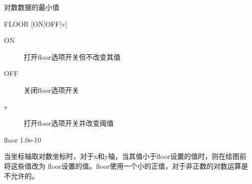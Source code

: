 \label{cmd:floor}

对数数据的最小值

\begin{SACSTX}
FLOOR [ON|OFF|v]
\end{SACSTX}

\begin{description}
\item [ON] 打开floor选项开关但不改变其值
\item [OFF] 关闭floor选项开关
\item [v] 打开floor选项开关并改变阈值
\end{description}

\begin{SACDFT}
floor 1.0e-10
\end{SACDFT}

当坐标轴取对数坐标时，对于x和y轴，当其值小于floor设置的值时，则在绘图前将这些值改为
floor设置的值。floor使用一个小的正值，对于非正数的对数运算是不允许的。
